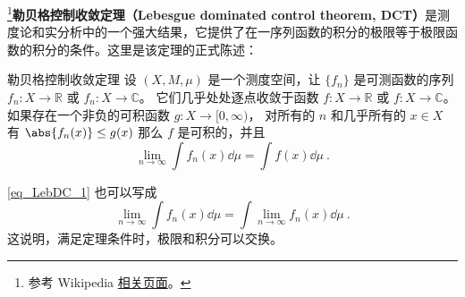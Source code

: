 
\begin{issues}
\issueDraft
\end{issues}


\footnote{参考 Wikipedia \href{https://en.wikipedia.org/wiki/Dominated_convergence_theorem}{相关页面}。}\textbf{勒贝格控制收敛定理（Lebesgue dominated control theorem, DCT）}是测度论和实分析中的一个强大结果，它提供了在一序列函数的积分的极限等于极限函数的积分的条件。这里是该定理的正式陈述：

\begin{theorem}{勒贝格控制收敛定理}
设 $(X,M,\mu)$ 是一个测度空间，让 $\{f_n\}$ 是可测函数的序列 $f_n: X\to\mathbb R$ 或 $f_n:X\to\mathbb C$。 它们几乎处处逐点收敛于函数 $f: X\to\mathbb R$ 或 $f:X\to\mathbb C$。 如果存在一个非负的可积函数 $g:X\to[0,\infty)$， 对所有的 $n$ 和几乎所有的 $x\in X$ 有 $\abs{f_n(x)}\leq g(x)$ 那么 $f$ 是可积的，并且
\begin{equation}\label{eq_LebDC_1}
\lim_{n\to\infty}\int f_n(x)\dd{\mu} = \int f(x)\dd{\mu}~.
\end{equation}
\end{theorem}

\autoref{eq_LebDC_1} 也可以写成
\begin{equation}
\lim_{n\to\infty}\int f_n(x)\dd{\mu} = \int\lim_{n\to\infty} f_n(x)\dd{\mu}~.
\end{equation}
这说明，满足定理条件时，极限和积分可以交换。
